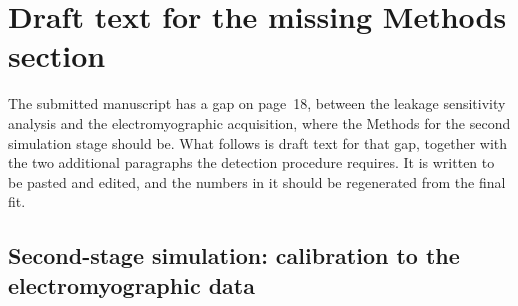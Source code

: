 \documentclass[a4paper,11pt]{article}
\newcommand{\1}{\mathbbm{1}}
\begin{document}
\section{Draft text for the missing Methods section}
\label{sec:methods}

The submitted manuscript has a gap on page~18, between the leakage sensitivity analysis
and the electromyographic acquisition, where the Methods for the second simulation stage
should be. What follows is draft text for that gap, together with the two additional
paragraphs the detection procedure requires. It is written to be pasted and edited, and
the numbers in it should be regenerated from the final fit.

\subsection*{Second-stage simulation: calibration to the electromyographic data}
\end{document}
